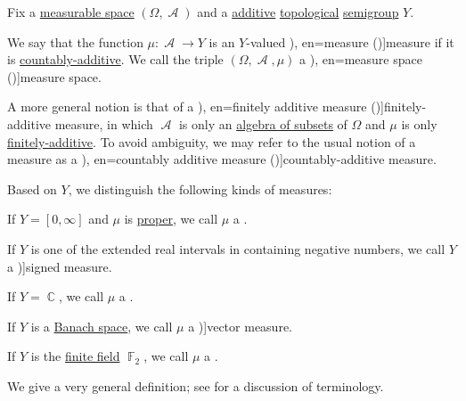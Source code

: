 \begin{definition}\label{def:measure}\mimprovised
  Fix a \hyperref[def:measurable_space]{measurable space} \( (\Omega, \mscrA) \) and a \hyperref[con:additive_semigroup]{additive} \hyperref[rem:topological_first_order_structures]{topological} \hyperref[def:semigroup]{semigroup} \( Y \).

  We say that the function \( \mu: \mscrA \to Y \) is an \( Y \)-valued \term[ru=мера (\cite[def. I.1.6]{Ширяев2007ВероятностиТом1}), en=measure (\cite[7]{Cohn2013Measures})]{measure} if it is \hyperref[def:boolean_algebra_additive_function/countable]{countably-additive}. We call the triple \( (\Omega, \mscrA, \mu) \) a \term[ru=пространство с мерой (\cite[def. 1.3.5]{Богачёв2003ТеорияМерыТом1}), en=measure space (\cite[8]{Cohn2013Measures})]{measure space}.

  A more general notion is that of a \term[ru=конечно аддитивная мера (\cite[def. I.1.2]{Ширяев2007ВероятностиТом1}), en=finitely additive measure (\cite[7]{Cohn2013Measures})]{finitely-additive measure}, in which \( \mscrA \) is only an \hyperref[def:algebra_of_subsets]{algebra of subsets} of \( \Omega \) and \( \mu \) is only \hyperref[def:boolean_algebra_additive_function/countable]{finitely-additive}. To avoid ambiguity, we may refer to the usual notion of a measure as a \term[ru=счётно аддитивная мера (\cite[def. I.1.6]{Ширяев2007ВероятностиТом1}), en=countably additive measure (\cite[7]{Cohn2013Measures})]{countably-additive measure}.

  Based on \( Y \), we distinguish the following kinds of measures:
  \begin{thmenum}
     If \( Y = [0, \infty] \) and \( \mu \) is \hyperref[def:effective_domain]{proper}, we call \( \mu \) a .

     If \( Y \) is one of the extended real intervals in  containing negative numbers, we call \( Y \) a \term[ru=знакопеременная мера (\cite[def. 20.1]{ДьяченкоУльянов1998ТеорияМеры})]{signed measure}.

     If \( Y = \BbbC \), we call \( \mu \) a .

     If \( Y \) is a \hyperref[def:banach_space]{Banach space}, we call \( \mu \) a \term[ru=векторная мера (\cite[349]{ИоффеТихомиров1974ЭкстремЗадачи})]{vector measure}.

     If \( Y \) is the \hyperref[def:finite_field]{finite field} \( \BbbF_2 \), we call \( \mu \) a .
  \end{thmenum}
\end{definition}
\begin{comments}
  \item We give a very general definition; see  for a discussion of terminology.
\end{comments}

